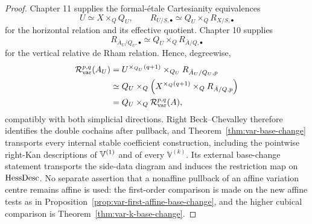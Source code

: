 \begin{proof}
Chapter 11 supplies the formal-\'etale Cartesianity equivalences
\[
    U\simeq X\times_QQ_U,
    \qquad
    R_{U/S,\bullet}\simeq Q_U\times_QR_{X/S,\bullet}
\]
for the horizontal relation and its effective quotient. Chapter 10 supplies
\[
    R_{\bar A_U/Q_U,\bullet}
    \simeq
    Q_U\times_QR_{\bar A/Q,\bullet}
\]
for the vertical relative de Rham relation. Hence, degreewise,
\[
\begin{aligned}
    \mathcal R_{\mathrm{var}}^{p,q}(A_U)
    &=
    U^{\times_{Q_U}(q+1)}
    \times_{Q_U}
    R_{\bar A_U/Q_U,p}
    \\
    &\simeq
    Q_U\times_Q
    \left(
      X^{\times_Q(q+1)}
      \times_Q
      R_{\bar A/Q,p}
    \right)
    \\
    &=
    Q_U\times_Q\mathcal R_{\mathrm{var}}^{p,q}(A),
\end{aligned}
\]
compatibly with both simplicial directions. Right Beck--Chevalley therefore identifies the double cochains after pullback, and Theorem~\ref{thm:var-base-change} transports every internal stable coefficient construction, including the pointwise right-Kan descriptions of \(\mathbb V^{(1)}\) and of every \(\mathbb V^{(k)}\). Its external base-change statement transports the side-data diagram and induces the restriction map on \(\operatorname{HessDesc}\). No separate assertion that a nonaffine pullback of an affine variation centre remains affine is used: the first-order comparison is made on the new affine tests as in Proposition~\ref{prop:var-first-affine-base-change}, and the higher cubical comparison is Theorem~\ref{thm:var-k-base-change}.
\end{proof}

